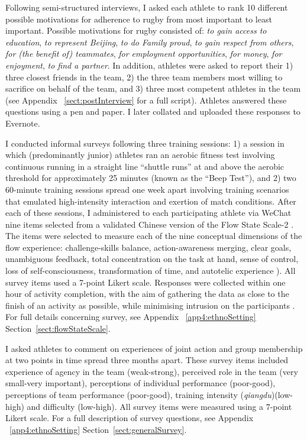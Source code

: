 \begin{CJK}{UTF8}{gbsn}
   Following semi-structured interviews, I asked each athlete to rank 10 different possible motivations for adherence to rugby from most important to least important. Possible motivations for rugby consisted of: \textit{to gain access to education}, \textit{to represent Beijing}, \textit{to do Family proud}, \textit{to gain respect from others}, \textit{for (the benefit of) teammates}, \textit{for employment opportunities}, \textit{for money}, \textit{for enjoyment}, \textit{to find a partner}. In addition, athletes were asked to report their 1) three closest friends in the team, 2) the three team members most willing to sacrifice on behalf of the team, and 3) three most competent athletes in the team (see Appendix ~\ref{sect:postInterview} for a full script). Athletes answered these questions using a pen and paper. I later collated and uploaded these responses to Evernote.

    I conducted informal surveys following three training sessions: 1) a session in which (predominantly junior) athletes ran an aerobic fitness test involving continuous running in a straight line ``shuttle runs''  at and above the aerobic threshold for approximately 25 minutes (known as the ``Beep Test''), and 2) two 60-minute training sessions spread one week apart involving training scenarios that emulated high-intensity interaction and exertion of match conditions.  After each of these sessions, I administered to each participating athlete via WeChat nine items selected from a validated Chinese version \citep{Liu2012} of the Flow State Scale-2 \citep{Jackson2002}.  The items were selected to measure each of the nine conceptual dimensions of the flow experience: challenge-skills balance, action-awareness merging, clear goals, unambiguous feedback, total concentration on the task at hand, sense of control, loss of self-consciousness, transformation of time, and autotelic experience \citep{Csikszentmihalyi1990}).  All survey items used a 7-point Likert scale.  Responses were collected within one hour of activity completion, with the aim of gathering the data as close to the finish of an activity as possible, while minimising intrusion on the participants \citep{Jackson2004}. For full details concerning survey, see Appendix ~\ref{app4:ethnoSetting} Section~\ref{sect:flowStateScale}.


    I asked athletes to comment on experiences of joint action and group membership at two points in time spread three months apart.  These survey items included experience of agency in the team (weak-strong), perceived role in the team (very small-very important), perceptions of individual performance (poor-good), perceptions of team performance (poor-good), training intensity (\textit{qiangdu})(low-high) and difficulty (low-high).  All survey items were measured using a 7-point Likert scale. For a full description of survey questions, see Appendix ~\ref{app4:ethnoSetting} Section~\ref{sect:generalSurvey}.





\end{CJK}
